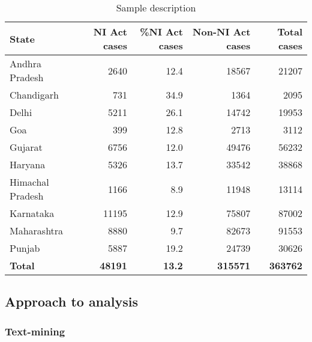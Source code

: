 \begin{longtable}{@{}lrrrr@{}}
\caption{Sample description}
\label{tab:sample_desc}\\
\toprule
\textbf{State} & \textbf{NI Act cases} & \textbf{\%NI Act cases} & \textbf{Non-NI Act cases} & \textbf{Total cases}\\* \midrule
\endhead
Andhra Pradesh & 2640 & 12.4 & 18567 & 21207\\
Chandigarh & 731 & 34.9 & 1364 & 2095\\
Delhi & 5211 & 26.1 & 14742 & 19953\\
Goa & 399 & 12.8 & 2713 & 3112\\
Gujarat & 6756 & 12.0 & 49476 & 56232\\
Haryana & 5326 & 13.7 & 33542 & 38868\\
Himachal Pradesh & 1166 & 8.9 & 11948 & 13114\\
Karnataka & 11195 & 12.9 & 75807 & 87002\\
Maharashtra & 8880 & 9.7 & 82673 & 91553\\
Punjab & 5887 & 19.2 & 24739 & 30626\\
\textbf{Total} & \textbf{48191} & \textbf{13.2} & \textbf{315571} & \textbf{363762}\\* \bottomrule
\end{longtable}

\subsection{Approach to analysis}
\label{sec:approach-analysis}

\subsubsection{Text-mining}
\label{sec:text-mining}

